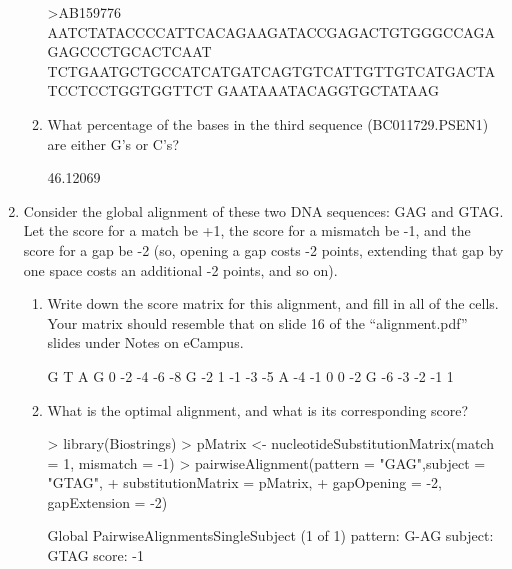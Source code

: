 \documentclass[12pt,a4paper]{paper}
\begin{document}
\begin{enumerate}
\begin{enumerate}
\begin{Schunk}
\begin{Soutput}
>AB159776
AATCTATACCCCATTCACAGAAGATACCGAGACTGTGGGCCAGAGAGCCCTGCACTCAAT
TCTGAATGCTGCCATCATGATCAGTGTCATTGTTGTCATGACTATCCTCCTGGTGGTTCT
GAATAAATACAGGTGCTATAAG
\end{Soutput}
\end{Schunk}
\item What percentage of the bases in the third sequence (BC011729.PSEN1) are either G’s or C’s?
\begin{Schunk}
\begin{Soutput}
[1] 46.12069
\end{Soutput}
\end{Schunk}
\end{enumerate}
\item Consider the global alignment of these two DNA sequences: GAG and GTAG. Let the score for a match be +1, the score for a mismatch be -1, and the score for a gap be -2 (so, opening a gap costs -2 points, extending that gap by one space costs an additional -2 points, and so on).
\begin{enumerate}
\item Write down the score matrix for this alignment, and fill in all of the cells. Your matrix should resemble that on slide 16 of the “alignment.pdf” slides under Notes on eCampus.
\begin{Schunk}
\begin{Soutput}
      G  T  A  G
   0 -2 -4 -6 -8
G -2  1 -1 -3 -5
A -4 -1  0  0 -2
G -6 -3 -2 -1  1
\end{Soutput}
\end{Schunk}
\item What is the optimal alignment, and what is its corresponding score?
\begin{Schunk}
\begin{Sinput}
> library(Biostrings)
> pMatrix <- nucleotideSubstitutionMatrix(match = 1, mismatch = -1)
> pairwiseAlignment(pattern = "GAG",subject = "GTAG", 
+                   substitutionMatrix = pMatrix, 
+                   gapOpening = -2, gapExtension = -2)
\end{Sinput}
\begin{Soutput}
Global PairwiseAlignmentsSingleSubject (1 of 1)
pattern: G-AG
subject: GTAG
score: -1 
\end{Soutput}
\end{Schunk}

\end{enumerate}
\end{enumerate}
\end{document}

